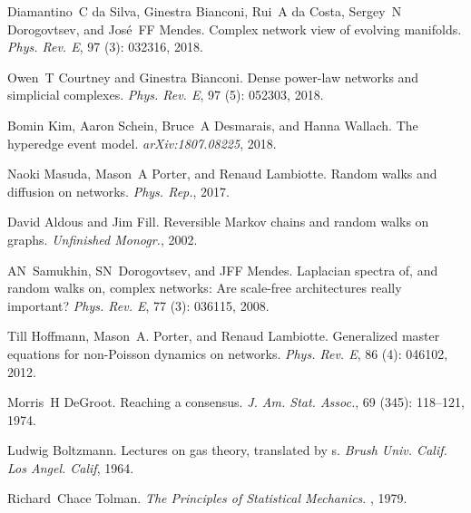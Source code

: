 Diamantino~C {da Silva}, Ginestra Bianconi, Rui~A {da Costa}, Sergey~N
Dorogovtsev, and Jos{\'e}~FF Mendes.
\newblock Complex network view of evolving manifolds.
\newblock \emph{Phys. Rev. E}, 97 (3): 032316, 2018.

Owen~T Courtney and Ginestra Bianconi.
\newblock Dense power-law networks and simplicial complexes.
\newblock \emph{Phys. Rev. E}, 97 (5): 052303, 2018.

Bomin Kim, Aaron Schein, Bruce~A Desmarais, and Hanna Wallach.
\newblock The hyperedge event model.
\newblock \emph{arXiv:1807.08225}, 2018.

Naoki Masuda, Mason~A Porter, and Renaud Lambiotte.
\newblock Random walks and diffusion on networks.
\newblock \emph{Phys. Rep.}, 2017.

David Aldous and Jim Fill.
\newblock Reversible {{Markov}} chains and random walks on graphs.
\newblock \emph{Unfinished Monogr.}, 2002.

AN~Samukhin, SN~Dorogovtsev, and JFF Mendes.
\newblock Laplacian spectra of, and random walks on, complex networks: {{Are}}
scale-free architectures really important?
\newblock \emph{Phys. Rev. E}, 77 (3): 036115, 2008.

Till Hoffmann, Mason~A. Porter, and Renaud Lambiotte.
\newblock Generalized master equations for non-{{Poisson}} dynamics on
networks.
\newblock \emph{Phys. Rev. E}, 86 (4): 046102, 2012.

Morris~H DeGroot.
\newblock Reaching a consensus.
\newblock \emph{J. Am. Stat. Assoc.}, 69 (345): 118--121,
1974.

Ludwig Boltzmann.
\newblock Lectures on gas theory, translated by s.
\newblock \emph{Brush Univ. Calif. Los Angel. Calif}, 1964.

Richard~Chace Tolman.
\newblock \emph{The Principles of Statistical Mechanics}.
, 1979.

